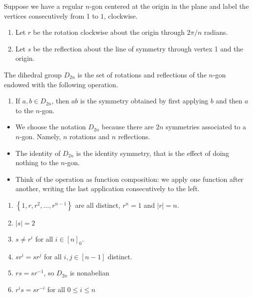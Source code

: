 \documentclass[11pt,a4paper]{article}
\begin{document}
Suppose we have  a regular \(n\)-gon centered at the origin in the plane and label the vertices consecutively from 1 to \(1\), clockwise.
\begin{enumerate}[label=(\roman*)]
    \item Let \(r\) be the rotation clockwise about the origin through \(2\pi / n\) radians. 
    \item  Let $s$ be the reflection about the line of symmetry through vertex 1 and the origin.
\end{enumerate}

The dihedral group \(D_{2n}\) is the set of rotations and reflections of the \(n\)-gon endowed with the following operation.
\begin{enumerate}[label=(\roman*),start=3]
    \item If \(a,b\in D_{2n}\), then \(ab\) is the symmetry obtained by first applying \(b\) and then \(a\) to the \(n\)-gon. 
\end{enumerate}





\begin{rem}
    \begin{itemize}
        \item We choose the notation \(D_{2n}\) because there are \(2n\) symmetries associated to a \(n\)-gon. Namely, \(n\) rotations and \(n\) reflections.
        \item The identity of \(D_{2n}\) is the identity symmetry, that is the effect of doing nothing to the \(n\)-gon.
        \item Think of the operation as function composition: we apply one function after another, writing the last application consecutively to the left.
    \end{itemize}
    
    
\end{rem}


\begin{teo}\hfill\null
\begin{enumerate}[label=(\roman*)]
    \item \(\left\{ 1,r,r^2,\ldots,r^{n-1} \right\}\) are all distinct,   \(r^n = 1\) and \(|r| = n\).
    \item \(|s| =2\)
    \item \(s\neq r^i\) for all \(i\in [n]_0\).
    \item \(sr^i = sr^j \) for all \(i,j\in [n-1]\) distinct.
    \item \(rs = sr^{-1}\), so \(D_{2n}\) is nonabelian
    \item \(r^i s = sr^{-i}\) for all \(0\leq i\leq n\)
\end{enumerate}
\end{teo}
\end{document}
